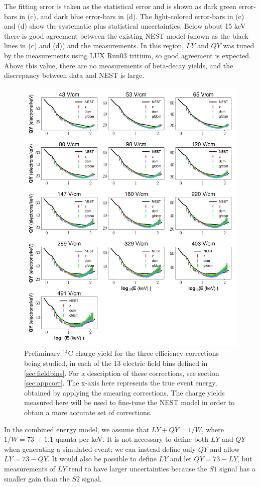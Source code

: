 The fitting error is taken as the statistical error and is shown as dark green error-bars in (c), and dark blue error-bars in (d). The light-colored error-bars in (c) and (d) show the systematic plus statistical uncertainties. Below about 15 keV there is good agreement between the existing NEST model (shown as the black lines in (c) and (d)) and the measurements. In this region, $LY$ and $QY$ was tuned by the measurements using LUX Run03 tritium, so good agreement is expected. Above this value, there are no measurements of beta-decay yields, and the discrepancy between data and NEST is large.


\begin{figure}[h!]
\centering
\includegraphics[width=\textwidth]{Figures/C14_QY_prelim.pdf}
\caption{Preliminary $^{14}$C charge yield for the three efficiency corrections being studied, in each of the 13 electric field bins defined in \ref{sec:fieldbins}. For a description of these corrections, see section \ref{sec:appcorr}. The x-axis here represents the true event energy, obtained by applying the smearing corrections. The charge yields measured here will be used to fine-tune the NEST model in order to obtain a more accurate set of corrections.}
\label{fig:C14_QY_prelim}
\end{figure}
In the combined energy model, we assume that $LY+QY=1/W$, where $1/W=73 \ \pm1.1$ quanta per keV. It is not necessary to define both $LY$ and $QY$ when generating a simulated event; we can instead define only $QY$ and allow $LY=73-QY$. It would also be possible to define $LY$ and let $QY=73-LY$, but measurements of $LY$ tend to have larger uncertainties because the $S1$ signal has a smaller gain than the $S2$ signal. 

